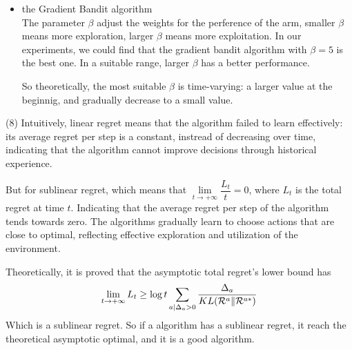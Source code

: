 \begin{itemize}
\item the Gradient Bandit algorithm \\
The parameter $\beta$ adjust the weights for the perference of the arm, smaller $\beta$ means more exploration, larger $\beta$ means more exploitation. In our experiments, we could find that the gradient bandit algorithm with $\beta=5$ is the best one. In a suitable range, larger $\beta$ has a better performance.

So theoretically, the most suitable $\beta$ is time-varying: a larger value at the beginnig, and gradually decrease to a small value.
\end{itemize}

(8) Intuitively, linear regret means that the algorithm failed to learn effectively: its average regret per step is a constant, instread of decreasing over time, indicating that the algorithm cannot improve decisions through historical experience.

But for sublinear regret, which means that $\lim\limits_{t\to+\infty}\dfrac{L_t}{t}=0$, where $L_t$ is the total regret at time $t$. Indicating that the average regret per step of the algorithm tends towards zero. The algorithms gradually learn to choose actions that are close to optimal, reflecting effective exploration and utilization of the environment.

Theoretically, it is proved that the asymptotic total regret's lower bound has
$$\lim_{t\to+\infty} L_t\geq \log t\sum_{a|\Delta_a>0}\dfrac{\Delta_a}{KL(\mathcal{R}^a\|\mathcal{R}^{a*})}$$
Which is a sublinear regret. So if a algorithm has a sublinear regret, it reach the theoretical asymptotic optimal, and it is a good algorithm.

\newpage